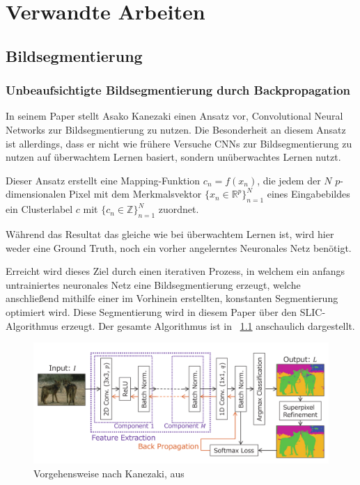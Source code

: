 \chapter{Verwandte Arbeiten}
\label{chap:verwarbeiten}

\section{Bildsegmentierung}
\label{sec:segmentation}

\subsection{Unbeaufsichtigte Bildsegmentierung durch Backpropagation}
\label{ssec:kanezaki}
In seinem Paper \cite{kanezaki_18} stellt Asako Kanezaki einen Ansatz vor, Convolutional Neural Networks zur Bildsegmentierung zu nutzen. Die Besonderheit an diesem Ansatz ist allerdings, dass er nicht wie frühere Versuche CNNs zur Bildsegmentierung zu nutzen auf überwachtem Lernen basiert, sondern unüberwachtes Lernen nutzt.

Dieser Ansatz erstellt eine Mapping-Funktion $c_n=f(x_n)$, die jedem der $N$ $p$-dimensionalen Pixel mit dem Merkmalsvektor $\{x_n\in\mathbb{R}^p\}_{n=1}^N$ eines Eingabebildes ein Clusterlabel $c$ mit $\{c_n\in\mathbb{Z}\}_{n=1}^N$ zuordnet.

Während das Resultat das gleiche wie bei überwachtem Lernen ist, wird hier weder eine Ground Truth, noch ein vorher angelerntes Neuronales Netz benötigt.

Erreicht wird dieses Ziel durch einen iterativen Prozess, in welchem ein anfangs untrainiertes neuronales Netz eine Bildsegmentierung erzeugt, welche anschließend mithilfe einer im Vorhinein erstellten, konstanten Segmentierung optimiert wird. Diese Segmentierung wird in diesem Paper über den SLIC-Algorithmus \cite{achanta_10} erzeugt. Der gesamte Algorithmus ist in \figurename~\ref{fig:Kan18_01} anschaulich dargestellt. 

\begin{figure}[h]
	\centering
	\includegraphics[width=.8\textwidth,keepaspectratio]{images/Kan18_01.png}
	\caption{Vorgehensweise nach Kanezaki, aus \cite{kanezaki_18}}
	\label{fig:Kan18_01}
\end{figure}

